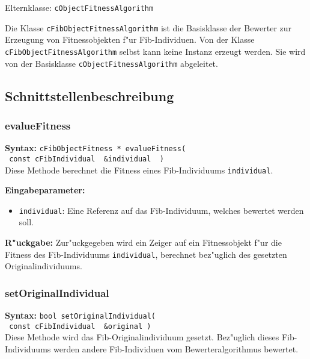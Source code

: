 Elternklasse: \verb|cObjectFitnessAlgorithm|

\bigskip\noindent
Die Klasse \verb|cFibObjectFitnessAlgorithm| ist die Basisklasse der Bewerter zur Erzeugung von Fitnessobjekten f"ur Fib-Individuen. Von der Klasse \verb|cFibObjectFitnessAlgorithm| selbst kann keine Instanz erzeugt werden. Sie wird von der Basisklasse \verb|cObjectFitnessAlgorithm| abgeleitet.


\subsection{Schnittstellenbeschreibung}

\subsubsection{evalueFitness}

\textbf{Syntax:} \verb|cFibObjectFitness * evalueFitness(| \\\verb| const cFibIndividual  &individual  )| \\

Diese Methode berechnet die Fitness eines Fib-Individuums \verb|individual|.

\bigskip\noindent
\textbf{Eingabeparameter:}
\begin{itemize}
 \item \verb|individual|: Eine Referenz auf das Fib-Individuum, welches bewertet werden soll.
\end{itemize}

\bigskip\noindent
\textbf{R"uckgabe:} Zur"uckgegeben wird ein Zeiger auf ein Fitnessobjekt f"ur die Fitness des Fib-Individuums \verb|individual|, berechnet bez"uglich des gesetzten Originalindividuums.


\subsubsection{setOriginalIndividual}

\textbf{Syntax:} \verb|bool setOriginalIndividual(| \\\verb| const cFibIndividual  &original )| \\

Diese Methode wird das Fib-Originalindividuum gesetzt. Bez"uglich dieses Fib-Individuums werden andere Fib-Individuen vom Bewerteralgorithmus bewertet.

